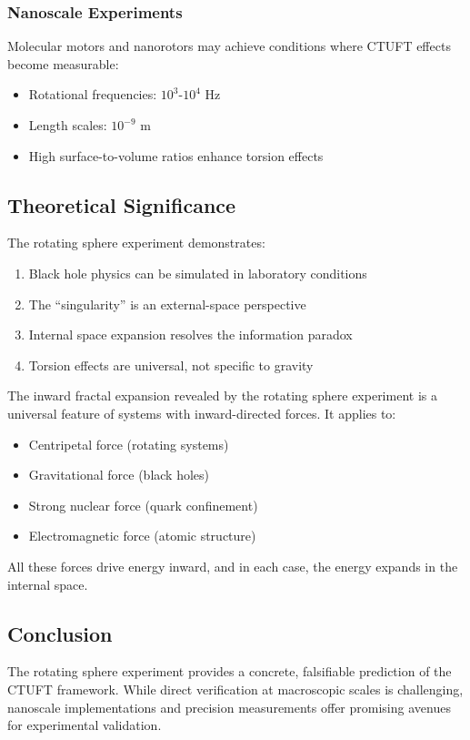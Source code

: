 \subsubsection{Nanoscale Experiments}

Molecular motors and nanorotors may achieve conditions where CTUFT effects become measurable:
\begin{itemize}
    \item Rotational frequencies: $10^3$-$10^4$ Hz
    \item Length scales: $10^{-9}$ m
    \item High surface-to-volume ratios enhance torsion effects
\end{itemize}

\subsection{Theoretical Significance}

The rotating sphere experiment demonstrates:
\begin{enumerate}
    \item Black hole physics can be simulated in laboratory conditions
    \item The ``singularity'' is an external-space perspective
    \item Internal space expansion resolves the information paradox
    \item Torsion effects are universal, not specific to gravity
\end{enumerate}

\begin{remark}
The inward fractal expansion revealed by the rotating sphere experiment is a universal feature of systems with inward-directed forces. It applies to:
\begin{itemize}
    \item Centripetal force (rotating systems)
    \item Gravitational force (black holes)
    \item Strong nuclear force (quark confinement)
    \item Electromagnetic force (atomic structure)
\end{itemize}
All these forces drive energy inward, and in each case, the energy expands in the internal space.
\end{remark}

\subsection{Conclusion}

The rotating sphere experiment provides a concrete, falsifiable prediction of the CTUFT framework. While direct verification at macroscopic scales is challenging, nanoscale implementations and precision measurements offer promising avenues for experimental validation.
